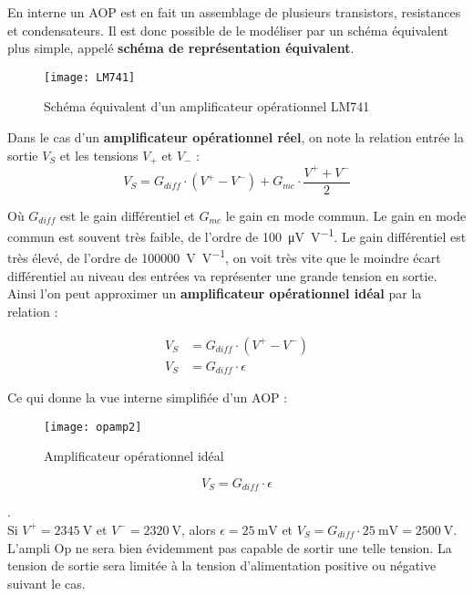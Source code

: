 En interne un AOP est en fait un assemblage de plusieurs transistors, resistances et condensateurs. 
Il est donc possible de le modéliser par un schéma équivalent plus simple, 
appelé \textbf{schéma de représentation équivalent}.
\begin{figure}[H]
    \centering
    \texttt{[image: LM741]}
    \caption{
        Schéma équivalent d'un amplificateur opérationnel LM741
    }
    \label{figOpampEquivalent}
\end{figure}

Dans le cas d'un \textbf{amplificateur opérationnel r\'eel}, on note la relation entrée
la sortie \(V_S\) et les tensions \(V_+\) et \(V_-\) :
\[
    V_S=G_{diff}\cdot\left(V^{+}-V^{-}\right)+G_{mc}\cdot\frac{V^{+}+V^{-}}{2}
\]

O\`u \(G_{diff}\) est le gain différentiel et \(G_{mc}\) le gain en mode commun.
Le gain en mode commun est souvent tr\`es faible, de l'ordre de \SI{100}{\micro\volt\per\volt}.
Le gain différentiel est tr\`es élevé, de l'ordre de \SI{100000}{\volt\per\volt}, 
on voit très vite que le moindre écart différentiel au niveau des entrées va 
représenter une grande tension en sortie.
Ainsi l'on peut approximer un \textbf{amplificateur opérationnel idéal} par la relation :

\begin{align*}
    V_S&=G_{diff}\cdot\left(V^{+}-V^{-}\right)\\
    V_S&=G_{diff}\cdot\epsilon
\end{align*}

Ce qui donne la vue interne simplifiée d'un AOP :\\
\begin{minipage}{0.79\textwidth}
    \begin{figure}[H]
        \centering
        \texttt{[image: opamp2]}
        \caption{Amplificateur opérationnel idéal}
        \label{figOpampIdeal}
    \end{figure}
\end{minipage}
\begin{minipage}{0.2\textwidth}
    \[
        V_{S}=G_{diff}\cdot\epsilon
    \]
\end{minipage}

\begin{example}.\\
    Si \(V^+=\SI{2345}{\volt}\) et \(V^-=\SI{2320}{\volt}\), alors \(\epsilon=\SI{25}{\milli\volt}\) et 
    \(V_S=G_{diff}\cdot\SI{25}{\milli\volt} = \SI{2500}{\volt}\).\\
    L'ampli Op ne sera bien évidemment pas capable de sortir une telle tension.
    La tension de sortie sera limitée à la tension d'alimentation positive ou
    négative suivant le cas.
\end{example}

